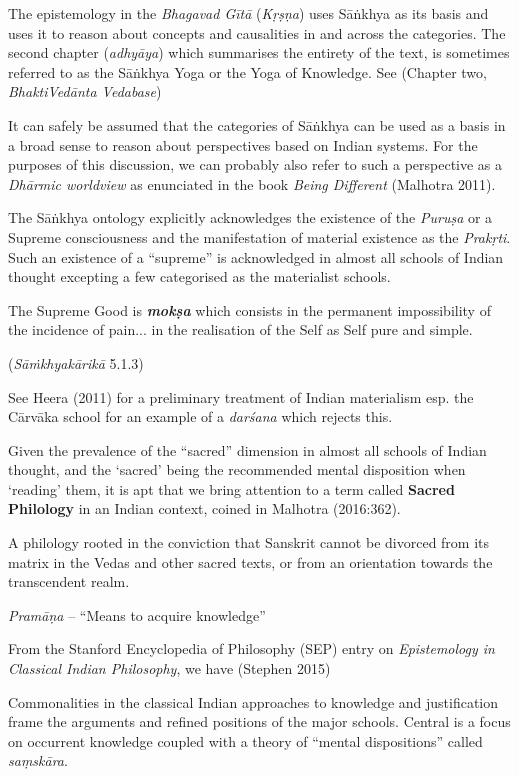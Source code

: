 The epistemology in the {\sl Bhagavad Gītā} ({\sl Kṛṣṇa}) uses Sāṅkhya as its basis and uses it to reason about concepts and causalities in and across the categories. The second chapter ({\sl adhyāya}) which summarises the entirety of the text, is sometimes referred to as the Sāṅkhya Yoga or the Yoga of Knowledge. See (Chapter two, {\sl BhaktiVedānta Vedabase}) 

It can safely be assumed that the categories of Sāṅkhya can be used as a basis in a broad sense to reason about perspectives based on Indian systems. For the purposes of this discussion, we can probably also refer to such a perspective as a {\sl Dhārmic worldview} as enunciated in the book {\sl Being Different} (Malhotra 2011).

The Sāṅkhya ontology explicitly acknowledges the existence of the {\sl Puruṣa} or a Supreme consciousness and the manifestation of material existence as the {\sl Prakṛti}. Such an existence of a ``supreme'' is acknowledged in almost all schools of Indian thought excepting a few categorised as the materialist schools. 
\begin{myquote}
The Supreme Good is {{\sl\bfseries mokṣa}\relax} which consists in the permanent impossibility of the incidence of pain... in the realisation of the Self as Self pure and simple.

\hfill ({\sl Sāṁkhyakārikā} 5.1.3)
\end{myquote}

See Heera (2011) for a preliminary treatment of Indian materialism esp. the Cārvāka school for an example of a {\sl darśana} which rejects this.

Given the prevalence of the ``sacred'' dimension in almost all schools of Indian thought, and the `sacred' being the recommended mental disposition when `reading' them, it is apt that  we bring attention to a term called {\bf Sacred Philology} in an Indian context, coined in Malhotra  (2016:362).
\begin{myquote}
A philology rooted in the conviction that Sanskrit cannot be divorced from its matrix in the Vedas and other sacred texts, or from an orientation towards the transcendent realm.
\end{myquote}

{\sl Pramāṇa} -- ``Means to acquire knowledge''

From the Stanford Encyclopedia of Philosophy (SEP) entry on {\sl Epistemology in Classical Indian Philosophy}, we have (Stephen 2015)
\begin{myquote}
Commonalities in the classical Indian approaches to knowledge and justification frame the arguments and refined positions of the major schools. Central is a focus on occurrent knowledge coupled with a theory of ``mental dispositions'' called {\sl saṃskāra}. 
\end{myquote}

